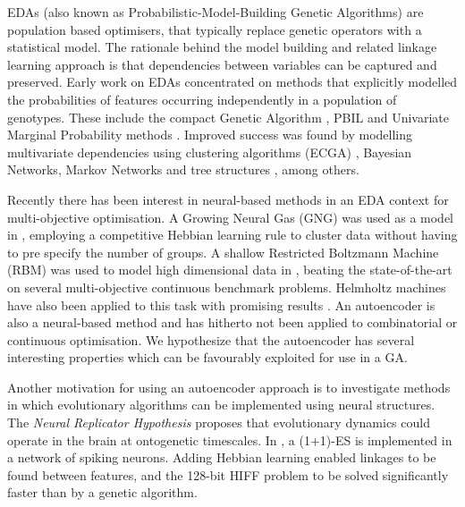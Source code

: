 \documentclass[runningheads,a4paper]{llncs}
\begin{document}
EDAs (also known as Probabilistic-Model-Building Genetic Algorithms) are population based optimisers, that typically replace genetic operators with a statistical model. The rationale behind the model building and related linkage learning approach is that dependencies between variables can be captured and preserved. Early work on EDAs concentrated on methods that explicitly modelled the probabilities of features occurring independently in a population of genotypes. These include the compact Genetic Algorithm \cite{harik1999compact}, PBIL \cite{baluja1994population} and Univariate Marginal Probability methods \cite{pelikan2002survey}. Improved success was found by modelling multivariate dependencies using clustering algorithms (ECGA) \cite{harik1999linkage}, Bayesian Networks, Markov Networks and tree structures \cite{pelikan2002survey}, among others.

Recently there has been interest in neural-based methods in an EDA context for multi-objective optimisation. A Growing Neural Gas (GNG) was used as a model in \cite{marti2008introducing}, employing a competitive Hebbian learning rule to cluster data without having to pre specify the number of groups. A shallow Restricted Boltzmann Machine (RBM) was used to model high dimensional data in \cite{tang2010restricted}, beating the state-of-the-art on several multi-objective continuous benchmark problems. Helmholtz machines have also been applied to this task with promising results \cite{zhang2000bayesian}. An autoencoder is also a  neural-based method and has hitherto not been applied to combinatorial or continuous optimisation. We hypothesize that the autoencoder has several interesting properties which can be favourably exploited for use in a GA. 

Another motivation for using an autoencoder approach is to investigate methods in which evolutionary algorithms can be implemented using neural structures. The {\em{Neural Replicator Hypothesis}} \cite{fernando2010neuronal} proposes that evolutionary dynamics could operate in the brain at ontogenetic timescales. In \cite{fernando2010neuronal}, a (1+1)-ES is implemented in a network of spiking neurons. Adding Hebbian learning enabled linkages to be found between features, and the 128-bit HIFF problem to be solved significantly faster than by a genetic algorithm. 
\end{document}
